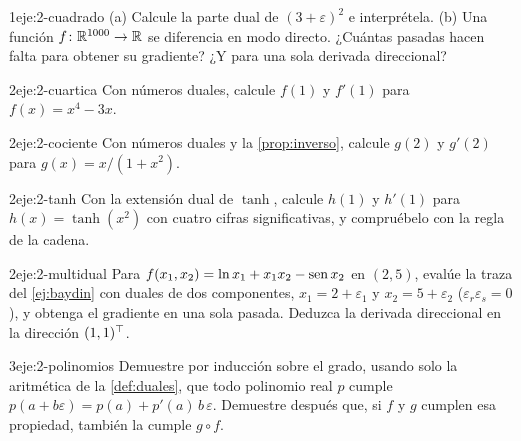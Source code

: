 \begin{ejercicio}{1}{eje:2-cuadrado}
(a) Calcule la parte dual de $(3+\varepsilon)^{2}$ e interprétela. (b) Una función $f\colon\mathbb{R}^{1000}\to\mathbb{R}$ se diferencia en modo directo. ¿Cuántas pasadas hacen falta para obtener su gradiente? ¿Y para una sola derivada direccional?
\end{ejercicio}

\begin{ejercicio}{2}{eje:2-cuartica}
Con números duales, calcule $f(1)$ y $f'(1)$ para $f(x)=x^{4}-3x$.
\end{ejercicio}

\begin{ejercicio}{2}{eje:2-cociente}
Con números duales y la \cref{prop:inverso}, calcule $g(2)$ y $g'(2)$ para $g(x)=x/(1+x^{2})$.
\end{ejercicio}

\begin{ejercicio}{2}{eje:2-tanh}
Con la extensión dual de $\tanh$, calcule $h(1)$ y $h'(1)$ para $h(x)=\tanh(x^{2})$ con cuatro cifras significativas, y compruébelo con la regla de la cadena.
\end{ejercicio}

\begin{ejercicio}{2}{eje:2-multidual}
Para $f(x_1,x_2)=\ln x_1+x_1x_2-\operatorname{sen} x_2$ en $(2,5)$, evalúe la traza del \cref{ej:baydin} con duales de dos componentes, $x_1=2+\varepsilon_1$ y $x_2=5+\varepsilon_2$ ($\varepsilon_r\varepsilon_s=0$), y obtenga el gradiente en una sola pasada. Deduzca la derivada direccional en la dirección $(1,1)^{\top}$.
\end{ejercicio}

\begin{ejercicio}{3}{eje:2-polinomios}
Demuestre por inducción sobre el grado, usando solo la aritmética de la \cref{def:duales}, que todo polinomio real $p$ cumple $p(a+b\varepsilon)=p(a)+p'(a)\,b\,\varepsilon$. Demuestre después que, si $f$ y $g$ cumplen esa propiedad, también la cumple $g\circ f$.
\end{ejercicio}
